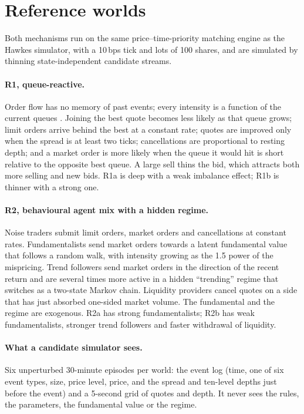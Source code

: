 \section{Reference worlds}
\label{app:worlds}

Both mechanisms run on the same price--time-priority matching engine as the Hawkes simulator, with a 10\,bps tick and lots of 100 shares, and are simulated by thinning state-independent candidate streams.

\paragraph{R1, queue-reactive.} Order flow has no memory of past events; every intensity is a function of the current queues \citep{huang2015queue}. Joining the best quote becomes less likely as that queue grows; limit orders arrive behind the best at a constant rate; quotes are improved only when the spread is at least two ticks; cancellations are proportional to resting depth; and a market order is more likely when the queue it would hit is short relative to the opposite best queue. A large sell thins the bid, which attracts both more selling and new bids. R1a is deep with a weak imbalance effect; R1b is thinner with a strong one.

\paragraph{R2, behavioural agent mix with a hidden regime.} Noise traders submit limit orders, market orders and cancellations at constant rates. Fundamentalists send market orders towards a latent fundamental value that follows a random walk, with intensity growing as the 1.5 power of the mispricing. Trend followers send market orders in the direction of the recent return and are several times more active in a hidden ``trending'' regime that switches as a two-state Markov chain. Liquidity providers cancel quotes on a side that has just absorbed one-sided market volume. The fundamental and the regime are exogenous. R2a has strong fundamentalists; R2b has weak fundamentalists, stronger trend followers and faster withdrawal of liquidity.

\paragraph{What a candidate simulator sees.} Six unperturbed 30-minute episodes per world: the event log (time, one of six event types, size, price level, price, and the spread and ten-level depths just before the event) and a 5-second grid of quotes and depth. It never sees the rules, the parameters, the fundamental value or the regime.

